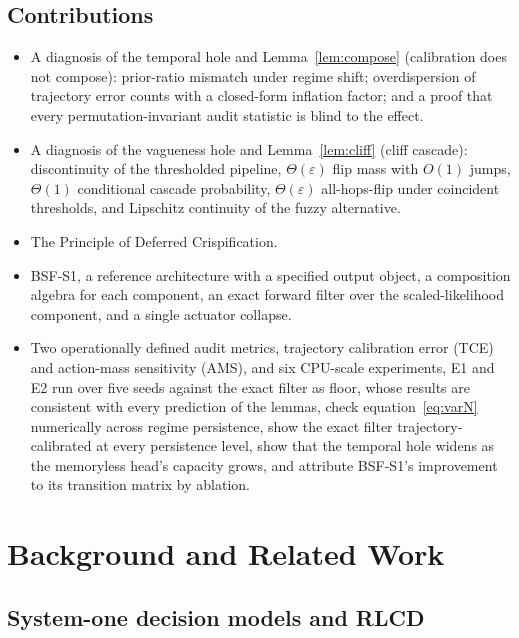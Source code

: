 \documentclass[11pt,a4paper]{article}
\numberwithin{equation}{section}
\theoremstyle{plain}
\theoremstyle{definition}
\theoremstyle{remark}
\begin{document}
\subsection{Contributions}

\begin{itemize}[leftmargin=2em]
\item[\textbf{C1}] A diagnosis of the temporal hole and Lemma~\ref{lem:compose} (calibration does not compose): prior-ratio mismatch under regime shift; overdispersion of trajectory error counts with a closed-form inflation factor; and a proof that every permutation-invariant audit statistic is blind to the effect.
\item[\textbf{C2}] A diagnosis of the vagueness hole and Lemma~\ref{lem:cliff} (cliff cascade): discontinuity of the thresholded pipeline, $\Theta(\varepsilon)$ flip mass with $O(1)$ jumps, $\Theta(1)$ conditional cascade probability, $\Theta(\varepsilon)$ all-hops-flip under coincident thresholds, and Lipschitz continuity of the fuzzy alternative.
\item[\textbf{C3}] The Principle of Deferred Crispification.
\item[\textbf{C4}] BSF-S1, a reference architecture with a specified output object, a composition algebra for each component, an exact forward filter over the scaled-likelihood component, and a single actuator collapse.
\item[\textbf{C5}] Two operationally defined audit metrics, trajectory calibration error (TCE) and action-mass sensitivity (AMS), and six CPU-scale experiments, E1 and E2 run over five seeds against the exact filter as floor, whose results are consistent with every prediction of the lemmas, check equation~\eqref{eq:varN} numerically across regime persistence, show the exact filter trajectory-calibrated at every persistence level, show that the temporal hole widens as the memoryless head's capacity grows, and attribute BSF-S1's improvement to its transition matrix by ablation.
\end{itemize}

\section{Background and Related Work}\label{sec:background}

\subsection{System-one decision models and RLCD}
\end{document}

